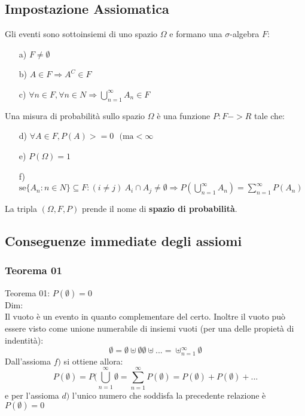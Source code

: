 \subsection{Impostazione Assiomatica}
Gli eventi sono sottoinsiemi di uno spazio $\Omega$ e formano una $\sigma$-algebra $F$:
\begin{itemize}
\item[a)] $ F \neq \emptyset$
\item[b)] $ A \in F \Rightarrow A^C \in F $
\item[c)] $ \forall n \in F, \forall n \in N \Rightarrow \bigcup_{n=1}^{\infty} A_n \in F $
\end{itemize}
Una misura di probabilità sullo spazio $\Omega$ è una funzione $P: F -> R$ tale che:
\begin{itemize}
\item[d)] $\forall A \in F, P(A) >= 0 \:\:\: (\text{ma} < \infty$
\item[e)] $ P(\Omega) = 1 $
\item[f)] $ \text{se} \{A_n: n \in N \} \subseteq F: (i \neq j ) \: A_i \cap A_j \neq \emptyset \Rightarrow P(\bigcup_{n=1}^{\infty}A_n) = \sum_{n=1}^{\infty}P(A_n)$
\end{itemize}
La tripla $(\Omega, F, P)$ prende il nome di \textbf{spazio di probabilità}.

\subsection{Conseguenze immediate degli assiomi}
\subsubsection{Teorema 01}
Teorema 01: $ P(\emptyset) = 0 $\\
Dim:\\
Il vuoto è un evento in quanto complementare del certo. Inoltre il vuoto può essere visto come unione numerabile di insiemi vuoti (per una delle propietà di indentità):
$$ \emptyset = \emptyset \uplus \emptyset \emptyset \uplus ... = \uplus_{n=1}^{\infty} \emptyset $$
Dall'assioma $f)$ si ottiene allora:
$$ P(\emptyset) = P(\bigcup_{n=1}^{\infty} \emptyset = \sum_{n=1}^{\infty} P(\emptyset) = P(\emptyset) + P(\emptyset) + ...$$
e per l'assioma $d)$ l'unico numero che soddisfa la precedente relazione è $P(\emptyset)=0$

